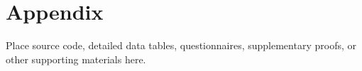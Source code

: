 \clearpage
\appendix
\chapter*{Appendix}
{}

Place source code, detailed data tables, questionnaires, supplementary proofs, or other supporting materials here.
